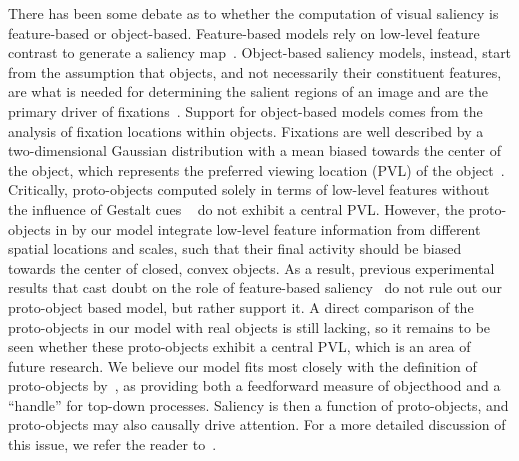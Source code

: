 There has been some debate as to whether the computation of visual saliency is feature-based or object-based. Feature-based models rely on low-level feature contrast to generate a saliency map~\citep[\eg][]{Itti_etal98a,Walther_Koch06}. Object-based saliency models, instead, start from the assumption that objects, and not necessarily their constituent features, are what is needed for determining the salient regions of an image and are the primary driver of fixations~\citep{Einhauser_etal08a,Nuthman_Henderson10,Stoll_etal15}.
%
%
Support for object-based models comes from the analysis of fixation locations within objects. Fixations are well described by a two-dimensional Gaussian distribution with a mean biased towards the center of the object, which represents the preferred viewing location (PVL) of the object~\citep{Nuthman_Henderson10}. Critically, proto-objects computed solely in terms of low-level features without the influence of Gestalt cues ~\citep{Walther_Koch06} do not exhibit a central PVL. However, the proto-objects in by our model integrate low-level feature information from different spatial locations and scales, such that their final activity should be biased towards the center of closed, convex objects. As a result, previous experimental results that cast doubt on the role of feature-based saliency~\citep{Einhauser_etal08a,Nuthman_Henderson10,Stoll_etal15} do not rule out our proto-object based model, but rather support it. A direct comparison of the proto-objects in our model with real objects is still lacking, so it remains to be seen whether these proto-objects exhibit a central PVL, which is an area of future research. We believe our model fits most closely with the definition of proto-objects by~\cite{Rensink00a}, as providing both a feedforward measure of objecthood and a ``handle'' for top-down processes. Saliency is then a function of proto-objects, and proto-objects may also causally drive attention. For a more detailed discussion of this issue, we refer the reader to~\citet{Russell_etal14}.

